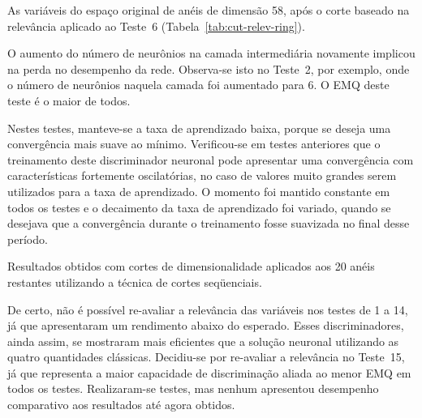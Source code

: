 \begin{table}
\caption{As variáveis do espaço original de anéis de dimensão 58, após o corte
baseado na relevância aplicado ao Teste~6 (Tabela~\ref{tab:cut-relev-ring}).}
\label{tab:config-left2}
\renewcommand{\baselinestretch}{1}
\begin{center}
\small

\normalsize
\renewcommand{\baselinestretch}{1.5}
\end{center}
\end{table}


O aumento do número de neurônios na camada intermediária novamente implicou na
perda no desempenho da rede. Observa-se isto no Teste~2, por exemplo, onde o
número de neurônios naquela camada foi aumentado para 6. O EMQ deste teste é o
maior de todos.

Nestes testes, manteve-se a taxa de aprendizado baixa, porque se deseja uma
convergência mais suave ao mínimo. Verificou-se em testes anteriores que o
treinamento deste discriminador neuronal pode apresentar uma convergência com
características fortemente oscilatórias, no caso de valores muito grandes
serem utilizados para a taxa de aprendizado. O momento foi mantido constante
em todos os testes e o decaimento da taxa de aprendizado foi variado, quando
se desejava que a convergência durante o treinamento fosse suavizada no final
desse período.

\begin{table}
\caption{Resultados obtidos com cortes de dimensionalidade aplicados aos 20
anéis restantes utilizando a técnica de cortes seqüenciais.}
\label{tab:left2}
\begin{center}
\small
\renewcommand{\baselinestretch}{1}
\begin{sideways}

\end{sideways}
\normalsize
\renewcommand{\baselinestretch}{1.5}
\end{center}
\end{table}

De certo, não é possível re-avaliar a relevância das variáveis nos testes de 1 a
14, já que apresentaram um rendimento abaixo do esperado. Esses
discriminadores, ainda assim, se mostraram mais eficientes que a solução
neuronal utilizando as quatro quantidades clássicas. Decidiu-se por re-avaliar a
relevância no Teste~15, já que representa a maior capacidade de discriminação
aliada ao menor EMQ em todos os testes. Realizaram-se testes, mas nenhum
apresentou desempenho comparativo aos resultados até agora obtidos.

